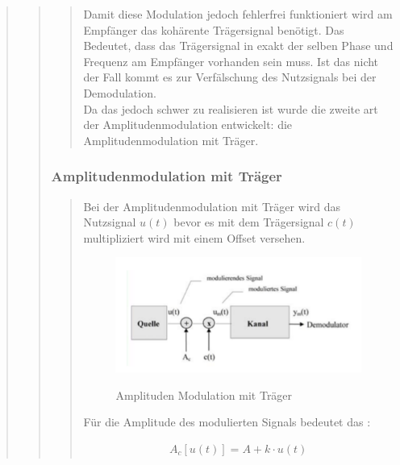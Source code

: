 \begin{quote}
\begin{quote}
\begin{quote}
             Damit diese Modulation jedoch fehlerfrei funktioniert wird am
             Empfänger das kohärente Trägersignal benötigt. Das Bedeutet, dass das Trägersignal in exakt der 
             selben Phase und Frequenz am Empfänger vorhanden sein muss. 
             Ist das nicht der Fall kommt es zur Verfälschung des Nutzsignals bei der Demodulation.\\
             Da das jedoch schwer zu realisieren ist wurde die zweite art der Amplitudenmodulation entwickelt:
             die Amplitudenmodulation mit Träger.
             
            
		\end{quote}
		
		\subsubsection{Amplitudenmodulation mit Träger}
		\begin{quote}
			Bei der Amplitudenmodulation mit Träger wird das Nutzsignal $u(t)$ bevor es mit dem Trägersignal $c(t)$
			multipliziert wird mit einem Offset versehen.
			
			\begin{figure}[H]
            \centering
                \includegraphics[scale=0.7, trim = 0cm 0cm 0cm 0cm, clip]{./Bilder/AMmitTraeger}
                    \caption{Amplituden Modulation mit Träger}
                    \cite{AMmitUeber}
            \end{figure}
            
            Für die Amplitude des modulierten Signals bedeutet das :
            
            \begin{equation*}
                \begin{split}
                    A_c [u(t)] = A + k \cdot u(t)
                \end{split}
            \end{equation*}
            

\end{quote}
\end{quote}
\end{quote}
